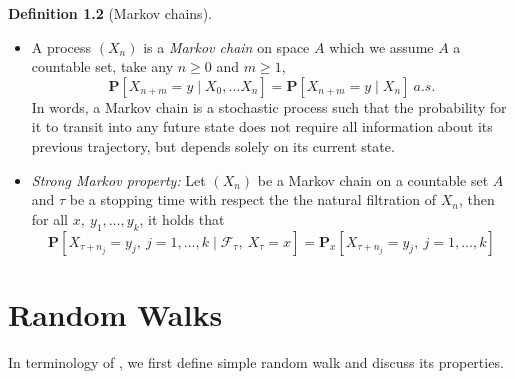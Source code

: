 \documentclass[
11pt, %
a4paper, %
oneside, %
headinclude,footinclude, %
BCOR5mm, %
]{scrartcl}
\begin{document}
\textbf{Definition 1.2} (Markov chains).
\begin{itemize}
    \item A process $(X_n)$ is a \textit{Markov chain} on space $A$ which we assume $A$ a countable set, take any $n \geq 0$ and $m \geq 1$,
\begin{equation}
\mathbf{P} [X_{n+m}=y \mid X_0, \dots X_n]=\mathbf{P}[X_{n+m}=y \mid X_n]\ a.s. \tag{1.3}
\end{equation}
In words, a Markov chain is a stochastic process such that the probability for it to transit into any future state does not require all information about its previous trajectory, but depends solely on its current state.
\item \textit{Strong Markov property:} Let $(X_n)$ be a Markov chain on a countable set $A$ and $\tau$ be a stopping time with respect the the natural filtration of $X_n$, then for all $x, \ y_1, \dots , y_k$, it holds that 
\begin{equation}
\label{SMP}
    \mathbf{P}[X_{\tau +n_j}=y_j,\ j=1,\dots, k \mid \mathscr{F}_\tau, \ X_\tau = x]=\mathbf{P}_x[X_{\tau +n_j}=y_j, \ j=1,\dots,k] \tag{1.4}
\end{equation}
\end{itemize}
\section{Random Walks}
In terminology of \cite{drewitz2014introduction}, we first define simple random walk and discuss its properties. 
\end{document}
